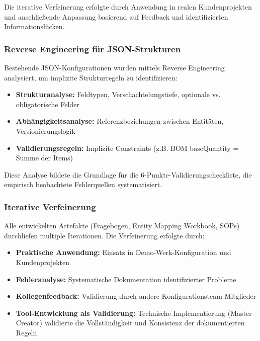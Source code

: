 Die iterative Verfeinerung erfolgte durch Anwendung in realen Kundenprojekten und anschließende Anpassung basierend auf Feedback und identifizierten Informationslücken.

\subsubsection{Reverse Engineering für JSON-Strukturen}
\label{subsubsec:ReverseEngineering}

Bestehende JSON-Konfigurationen wurden mittels Reverse Engineering analysiert, um implizite Strukturregeln zu identifizieren:

\begin{itemize}
    \item \textbf{Strukturanalyse:} Feldtypen, Verschachtelungstiefe, optionale vs. obligatorische Felder
    \item \textbf{Abhängigkeitsanalyse:} Referenzbeziehungen zwischen Entitäten, Versionierungslogik
    \item \textbf{Validierungsregeln:} Implizite Constraints (z.B. BOM baseQuantity = Summe der Items)
\end{itemize}

Diese Analyse bildete die Grundlage für die 6-Punkte-Validierungscheckliste, die empirisch beobachtete Fehlerquellen systematisiert.

\subsubsection{Iterative Verfeinerung}
\label{subsubsec:IterativeVerfeinerung}

Alle entwickelten Artefakte (Fragebogen, Entity Mapping Workbook, SOPs) durchliefen multiple Iterationen. Die Verfeinerung erfolgte durch:

\begin{itemize}
    \item \textbf{Praktische Anwendung:} Einsatz in Demo-Werk-Konfiguration und Kundenprojekten
    \item \textbf{Fehleranalyse:} Systematische Dokumentation identifizierter Probleme
    \item \textbf{Kollegenfeedback:} Validierung durch andere Konfigurationsteam-Mitglieder
    \item \textbf{Tool-Entwicklung als Validierung:} Technische Implementierung (Master Creator) validierte die Vollständigkeit und Konsistenz der dokumentierten Regeln
\end{itemize}


